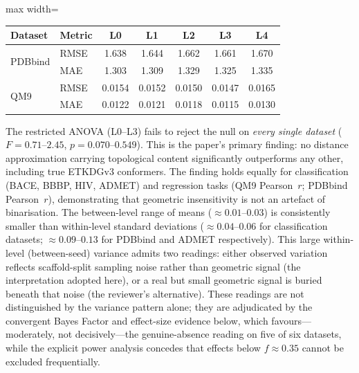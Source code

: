 \documentclass[pdflatex,sn-vancouver-num]{sn-jnl}%
\theoremstyle{thmstyleone}%
\theoremstyle{thmstyletwo}%
\theoremstyle{thmstylethree}%
\renewenvironment{table}[1][htbp]%
{\begin{tableorg}[#1]%
\begin{center}
\begin{adjustbox}{max width=\linewidth}
\begin{threeparttable}
\tablebodyfont%
\renewcommand\footnotetext[2][]{{\removelastskip\vskip3pt%
\let\tablebodyfont\tablefootnotefont%
\hskip0pt\if!##1!\else{\smash{$^{##1}$}}\fi##2\par}}%
}{\end{threeparttable}\end{adjustbox}\end{center}\end{tableorg}}
\begin{document}
\begin{table}[htbp]
  \centering
  \caption{Regression Results: RMSE and MAE across distance levels for PDBbind and QM9.}
  \label{tab:regression_results}
  \renewcommand{\arraystretch}{1.3}
  \scriptsize
  \begin{tabular}{|l|l|c|c|c|c|c|}
    \hline
    \textbf{Dataset} & \textbf{Metric} & \textbf{L0} & \textbf{L1} & \textbf{L2} & \textbf{L3} & \textbf{L4} \\
    \hline
    \multirow{2}{*}{PDBbind} & RMSE & 1.638 & 1.644 & 1.662 & 1.661 & 1.670 \\
                             & MAE  & 1.303 & 1.309 & 1.329 & 1.325 & 1.335 \\
    \hline
    \multirow{2}{*}{QM9}     & RMSE & 0.0154 & 0.0152 & 0.0150 & 0.0147 & 0.0165 \\
                             & MAE  & 0.0122 & 0.0121 & 0.0118 & 0.0115 & 0.0130 \\
    \hline
  \end{tabular}
\end{table}

\FloatBarrier



The restricted ANOVA (L0--L3) fails to reject the null on \emph{every
single dataset} ($F = 0.71$--$2.45$, $p = 0.070$--$0.549$).  This is the
paper's primary finding: no distance approximation carrying topological
content significantly outperforms any other, including true ETKDGv3
conformers.  The finding holds equally for classification (BACE, BBBP, HIV,
ADMET) and regression tasks (QM9 Pearson~$r$; PDBbind Pearson~$r$),
demonstrating that geometric insensitivity is not an artefact of
binarisation.  The between-level range of means ($\approx 0.01$--$0.03$)
is consistently smaller than within-level standard deviations
($\approx 0.04$--$0.06$ for classification datasets; $\approx 0.09$--$0.13$
for PDBbind and ADMET respectively).  This large within-level (between-seed) variance admits two readings: either observed variation reflects scaffold-split sampling noise rather than geometric signal (the interpretation adopted here), or a real but small geometric signal is buried beneath that noise (the reviewer's alternative).  These readings are not distinguished by the variance pattern alone; they are adjudicated by the convergent Bayes Factor and effect-size evidence below, which favours---moderately, not decisively---the genuine-absence reading on five of six datasets, while the explicit power analysis concedes that effects below $f \approx 0.35$ cannot be excluded frequentially.
\end{document}
